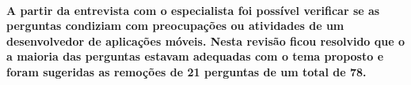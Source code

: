     \paragraph{
    A partir da entrevista com o especialista foi possível verificar se as perguntas condiziam com preocupações ou atividades de um desenvolvedor de aplicações móveis. Nesta revisão ficou resolvido que o a maioria das perguntas estavam adequadas com o tema proposto e foram sugeridas as remoções de 21 perguntas de um total de 78.}
    
    
 

 
 

 

 
 
 
 
 
 






